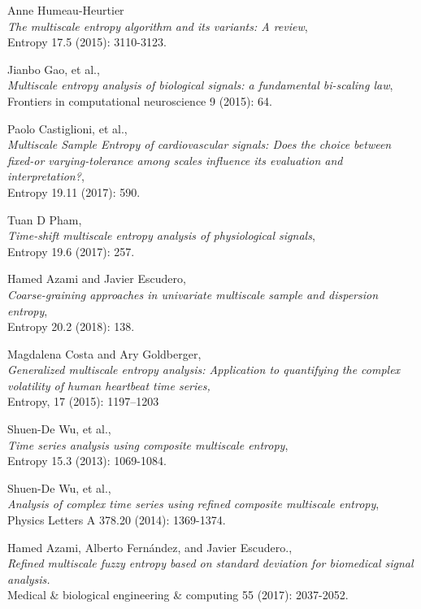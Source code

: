 \documentclass[12pt, a4paper, titlepage, openany]{book}
\begin{document}
\begin{thebibliography}{9}
Anne Humeau-Heurtier \\
\emph{The multiscale entropy algorithm and its variants: A review},\\
Entropy 17.5 (2015): 3110-3123.

Jianbo Gao, et al.,\\
\emph{Multiscale entropy analysis of biological signals: a fundamental bi-scaling law},\\
Frontiers in computational neuroscience 9 (2015): 64.

Paolo Castiglioni, et al.,\\
\emph{Multiscale Sample Entropy of cardiovascular signals: Does the choice between fixed-or varying-tolerance among scales influence its evaluation and interpretation?},\\
Entropy 19.11 (2017): 590.

Tuan D Pham,\\
\emph{Time-shift multiscale entropy analysis of physiological signals},\\
Entropy 19.6 (2017): 257.

Hamed Azami and Javier Escudero,\\
\emph{Coarse-graining approaches in univariate multiscale sample and dispersion entropy},\\
Entropy 20.2 (2018): 138.

Magdalena Costa and Ary Goldberger,\\
\emph{Generalized multiscale entropy analysis: Application to quantifying the complex volatility of human heartbeat time series,}\\ Entropy, 17 (2015): 1197–1203

Shuen-De Wu, et al.,\\
\emph{Time series analysis using composite multiscale entropy},\\
Entropy 15.3 (2013): 1069-1084.

Shuen-De Wu, et al.,\\
\emph{Analysis of complex time series using refined composite multiscale entropy},\\
Physics Letters A 378.20 (2014): 1369-1374.

Hamed Azami, Alberto Fernández, and Javier Escudero.,\\
\emph{Refined multiscale fuzzy entropy based on standard deviation for biomedical signal analysis.}\\
Medical \& biological engineering \& computing 55 (2017): 2037-2052.


\end{thebibliography}
\end{document}
